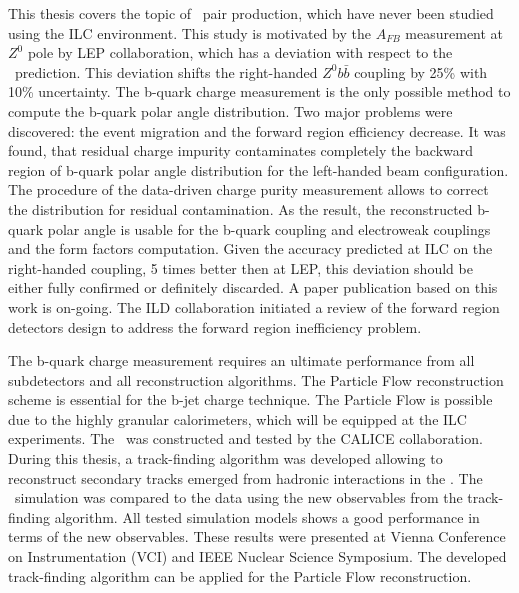 This thesis covers the topic of \bbbar\ pair production, which have never been studied using the ILC environment. 
This study is motivated by the $A_{FB}$ measurement at $Z^0$ pole by LEP collaboration, which has a deviation with respect to the \sm\ prediction.
This deviation shifts the right-handed $Z^0b\bar{b}$ coupling by 25\% with 10\% uncertainty.
The b-quark charge measurement is the only possible method to compute the b-quark polar angle distribution. 
Two major problems were discovered: the event migration and the forward region efficiency decrease. 
It was found, that residual charge impurity contaminates completely the backward region of b-quark polar angle distribution for the left-handed beam configuration.
The procedure of the data-driven charge purity measurement allows to correct the distribution for residual contamination. 
As the result, the reconstructed b-quark polar angle is usable for the b-quark coupling and electroweak couplings and the form factors computation. 
Given the accuracy predicted at ILC on the right-handed coupling, 5 times better then at LEP, this deviation should be either fully confirmed or definitely discarded. 
A paper publication based on this work is on-going.
The ILD collaboration initiated a review of the forward region detectors design to address the forward region inefficiency problem.

The b-quark charge measurement requires an ultimate performance from all subdetectors and all reconstruction algorithms. The Particle Flow reconstruction scheme is essential for the b-jet charge technique.
The Particle Flow is possible due to the highly granular calorimeters, which will be equipped at the ILC experiments. 
The \ecalp\ was constructed and tested by the CALICE collaboration. 
During this thesis, a track-finding algorithm was developed allowing to reconstruct secondary tracks emerged from hadronic interactions in the \ecalp.
The \ecalp\ simulation was compared to the data using the new observables from the track-finding algorithm. 
All tested simulation models shows a good performance in terms of the new observables. 
These results were presented at Vienna Conference on Instrumentation (VCI) and IEEE Nuclear Science Symposium.
The developed track-finding algorithm can be applied for the Particle Flow reconstruction. 